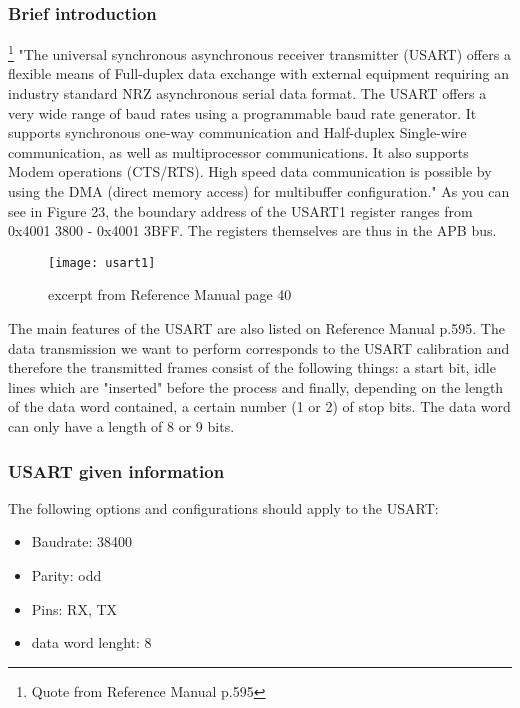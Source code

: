 \documentclass[11pt]{scrartcl}
\begin{document}
	\subsubsection{Brief introduction}
\footnote{\label{foot:21}Quote from Reference Manual p.595} "The universal synchronous asynchronous receiver transmitter (USART) offers a flexible means of Full-duplex data exchange with external equipment requiring an industry standard NRZ asynchronous serial data format. The USART offers a very wide range of baud rates using a programmable baud rate generator. It supports synchronous one-way communication and Half-duplex Single-wire communication, as well as multiprocessor communications. It also supports Modem operations (CTS/RTS). High speed data communication is possible by using the DMA (direct memory access) for multibuffer configuration."
\newline\newline
As you can see in Figure 23, the boundary address of the USART1 register ranges from 0x4001 3800 - 0x4001 3BFF. The registers themselves are thus in the APB bus.
\begin{figure}[h]
		\centering
		\texttt{[image: usart1]}
		\caption{excerpt from Reference Manual page 40}
\end{figure}
The main features of the USART are also listed on Reference Manual p.595. The data transmission we want to perform corresponds to the USART calibration and therefore the transmitted frames consist of the following things: a start bit, idle lines which are "inserted" before the process and finally, depending on the length of the data word contained, a certain number (1 or 2) of stop bits. The data word can only have a length of 8 or 9 bits.
	\subsubsection{USART given information}
The following options and configurations should apply to the USART:
\begin{itemize}
  \item Baudrate: 38400
  \item Parity: odd
  \item	Pins: RX, TX
  \item data word lenght: 8
\end{itemize}



\newpage
\end{document}
